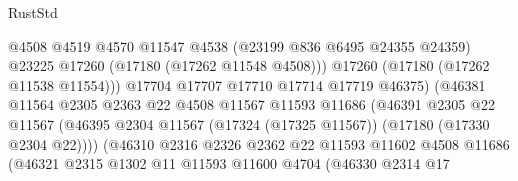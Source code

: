 \begin{lexlean}{RustStd}
\begin{coremodule}
                                          @4508
                                          @4519
                                          @4570
                                          @11547
                                          @4538
                                          (@23199 @836 @6495 @24355 @24359)
                                          @23225
                                          @17260
                                          (@17180 (@17262 @11548 @4508)))
                                        @17260
                                        (@17180 (@17262 @11538 @11554)))
                                      @17704
                                      @17707
                                      @17710
                                      @17714
                                      @17719
                                      @46375)
                                    (@46381
                                      @11564
                                      @2305
                                      @2363
                                      @22
                                      @4508
                                      @11567
                                      @11593
                                      @11686
                                      (@46391
                                        @2305
                                        @22
                                        @11567
                                        (@46395
                                          @2304
                                          @11567
                                          (@17324 (@17325 @11567))
                                          (@17180 (@17330 @2304 @22))))
                                      (@46310
                                        @2316
                                        @2326
                                        @2362
                                        @22
                                        @11593
                                        @11602
                                        @4508
                                        @11686
                                        (@46321
                                          @2315
                                          @1302
                                          @11
                                          @11593
                                          @11600
                                          @4704
                                          (@46330
                                            @2314
                                            @17

\end{coremodule}
\end{lexlean}
